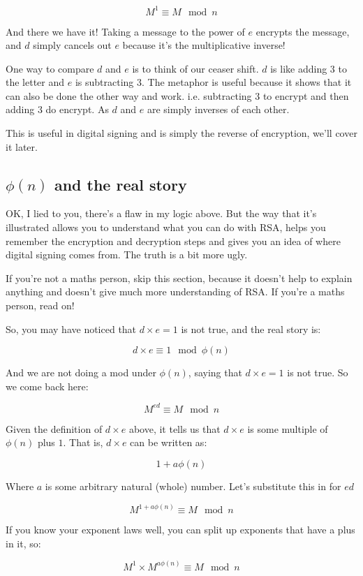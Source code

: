 \documentclass{article}
\begin{document}
  \[ M^{1} \equiv M \mod n \]

  And there we have it! Taking a message to the power of $e$ encrypts the message,
  and $d$ simply cancels out $e$ because it's the multiplicative inverse!

  One way to compare $d$ and $e$ is to think of our ceaser shift. $d$ is like
  adding 3 to the letter and $e$ is subtracting 3. The metaphor is useful because
  it shows that it can also be done the other way and work. i.e. subtracting 3
  to encrypt and then adding 3 do encrypt. As $d$ and $e$ are simply inverses
  of each other.

  This is useful in digital signing and is simply the reverse of encryption, we'll
  cover it later.

  \subsection*{$\phi(n)$ and the real story}
  OK, I lied to you, there's a flaw in my logic above. But the way that it's 
  illustrated allows you to understand what you can do with RSA, helps you
  remember the encryption and decryption steps and gives you an idea of where
  digital signing comes from. The truth is a bit more ugly.

  If you're not a maths person, skip this section, because it doesn't help to
  explain anything and doesn't give much more understanding of RSA. If you're
  a maths person, read on!

  So, you may have noticed that $d \times e = 1$ is not true, and the real story
  is:

  \[ d \times e \equiv 1 \mod \phi(n) \]

  And we are not doing a mod under $\phi(n)$, saying that $d \times e = 1$ is
  not true. So we come back here:

  \[ M^{ed} \equiv M \mod n \]

  Given the definition of $d \times e$ above, it tells us that $d \times e$ is
  some multiple of $\phi(n)$ plus $1$. That is, $d \times e$ can be written as:

  \[ 1 + a\phi(n) \]
  
  Where $a$ is some arbitrary natural (whole) number. Let's substitute this in for $ed$

  \[ M^{1 + a\phi(n)} \equiv M \mod n \]

  If you know your exponent laws well, you can split up exponents that have a 
  plus in it, so:

  \[ M^{1} \times M^{a\phi(n)} \equiv M \mod n \]
\end{document}
